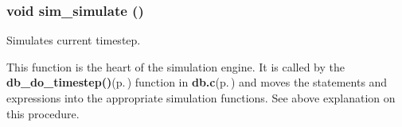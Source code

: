 \subsubsection{\setlength{\rightskip}{0pt plus 5cm}void sim\_\-simulate ()}\label{sim_8h_a4}


Simulates current timestep. 

This function is the heart of the simulation engine. It is called by the {\bf db\_\-do\_\-timestep()}{\rm (p.\,\pageref{db_8c_a45})} function in {\bf db.c}{\rm (p.\,\pageref{db_8c})} and moves the statements and expressions into the appropriate simulation functions. See above explanation on this procedure. 